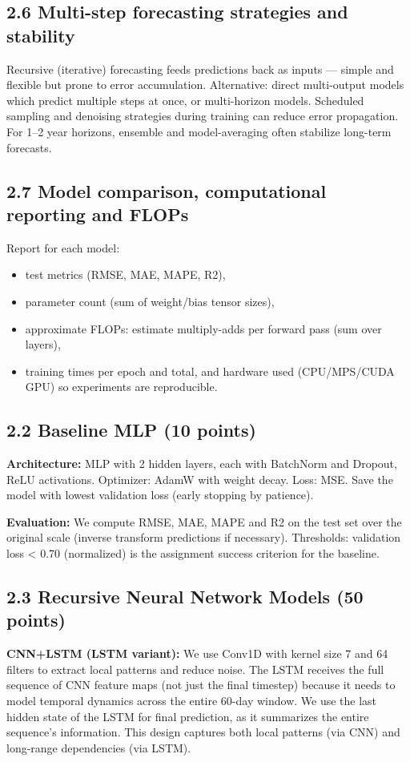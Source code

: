 \documentclass[conference]{IEEEtran}
\begin{document}
\subsection{2.6 Multi-step forecasting strategies and stability}
Recursive (iterative) forecasting feeds predictions back as inputs — simple and flexible but prone to error accumulation. Alternative: direct multi-output models which predict multiple steps at once, or multi-horizon models. Scheduled sampling and denoising strategies during training can reduce error propagation. For 1--2 year horizons, ensemble and model-averaging often stabilize long-term forecasts.

\subsection{2.7 Model comparison, computational reporting and FLOPs}
Report for each model:
\begin{itemize}
  \item test metrics (RMSE, MAE, MAPE, R2),\
  \item parameter count (sum of weight/bias tensor sizes),\
  \item approximate FLOPs: estimate multiply-adds per forward pass (sum over layers),\
  \item training times per epoch and total, and hardware used (CPU/MPS/CUDA GPU) so experiments are reproducible.
\end{itemize}


\subsection{2.2 Baseline MLP (10 points)}
\textbf{Architecture:} MLP with 2 hidden layers, each with BatchNorm and Dropout, ReLU activations. Optimizer: AdamW with weight decay. Loss: MSE. Save the model with lowest validation loss (early stopping by patience).

\textbf{Evaluation:} We compute RMSE, MAE, MAPE and R2 on the test set over the original scale (inverse transform predictions if necessary). Thresholds: validation loss < 0.70 (normalized) is the assignment success criterion for the baseline.

\subsection{2.3 Recursive Neural Network Models (50 points)}
\textbf{CNN+LSTM (LSTM variant):} We use Conv1D with kernel size 7 and 64 filters to extract local patterns and reduce noise. The LSTM receives the full sequence of CNN feature maps (not just the final timestep) because it needs to model temporal dynamics across the entire 60-day window. We use the last hidden state of the LSTM for final prediction, as it summarizes the entire sequence's information. This design captures both local patterns (via CNN) and long-range dependencies (via LSTM).
\end{document}

